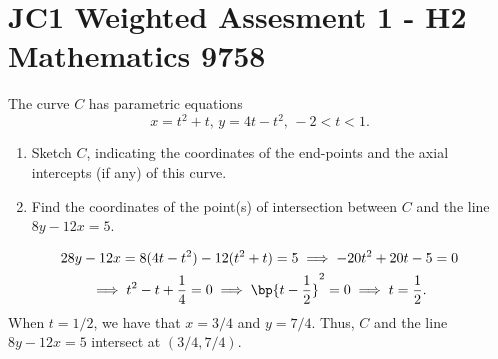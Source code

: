 \section{JC1 Weighted Assesment 1 - H2 Mathematics 9758}

\begin{problem}
    The curve $C$ has parametric equations \[x = t^2 + t, \, y = 4t - t^2, \, -2 < t < 1.\]

    \begin{enumerate}
        \item Sketch $C$, indicating the coordinates of the end-points and the axial intercepts (if any) of this curve.
        \item Find the coordinates of the point(s) of intersection between $C$ and the line $8y - 12x = 5$.
    \end{enumerate}
\end{problem}
\begin{solution}
    \begin{ppart}
        \begin{center}
        \end{center}
    \end{ppart}
    \begin{ppart}
        \begin{gather*}{2}
            8y-12x = 8(4t-t^2) - 12(t^2 + t) = 5 \implies -20t^2 + 20t - 5 = 0 \\
            \implies t^2 - t + \frac14 = 0 \implies \bp{t - \frac12}^2 = 0 \implies t = \frac12.
        \end{gather*}
        When $t = 1/2$, we have that $x = 3/4$ and $y = 7/4$. Thus, $C$ and the line $8y-12x=5$ intersect at $(3/4, 7/4)$.
    \end{ppart}
\end{solution}

